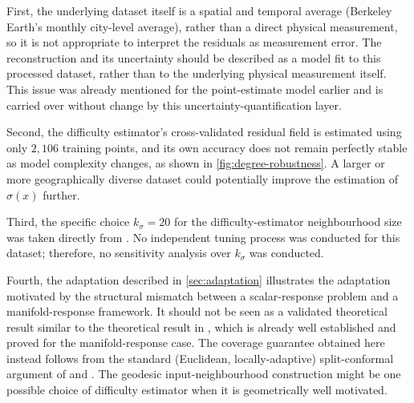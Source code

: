 \documentclass[11pt,a4paper]{report}
\begin{document}
First, the underlying dataset itself is a spatial and temporal average (Berkeley Earth's monthly city-level average), rather than a direct physical measurement, so it is not appropriate to interpret the residuals as measurement error. The reconstruction and its uncertainty should be described as a model fit to this processed dataset, rather than to the underlying physical measurement itself. This issue was already mentioned for the point-estimate model earlier and is carried over without change by this uncertainty-quantification layer. 

Second, the difficulty estimator's cross-validated residual field is estimated using only $2{,}106$ training points, and its own accuracy does not remain perfectly stable as model complexity changes, as shown in \cref{fig:degree-robustness}. A larger or more geographically diverse dataset could potentially improve the estimation of $\hat\sigma(x)$ further. 

Third, the specific choice $k_\sigma=20$ for the difficulty-estimator neighbourhood size was taken directly from \citet{amirishahbazi2026}. No independent tuning process was conducted for this dataset; therefore, no sensitivity analysis over $k_\sigma$ was conducted.

Fourth, the adaptation described in \cref{sec:adaptation} illustrates the adaptation motivated by the structural mismatch between a scalar-response problem and a manifold-response framework. It should not be seen as a validated theoretical result similar to the theoretical result in \citeauthor{amirishahbazi2026}, which is already well established and proved for the manifold-response case. The coverage guarantee obtained here instead follows from the standard (Euclidean, locally-adaptive) split-conformal argument of \citet{lei2018} and \citet{romano2019}. The geodesic input-neighbourhood construction might be one possible choice of difficulty estimator when it is geometrically well motivated.
\end{document}
